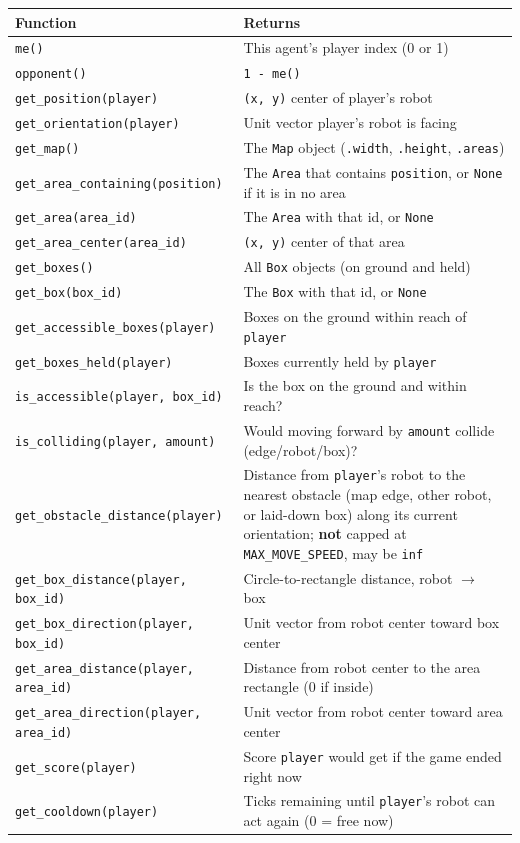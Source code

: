 \documentclass[11pt,a4paper]{article}
\newcommand{\code}[1]{\texttt{#1}}
\newcommand{\func}[1]{\texttt{#1}}
\begin{document}
\begin{longtable}{p{6.7cm}p{8.3cm}}
\toprule
\textbf{Function} & \textbf{Returns} \\
\midrule
\endhead
\func{me()} & This agent's player index (0 or 1) \\
\func{opponent()} & \code{1 - me()} \\
\func{get\_position(player)} & \code{(x, y)} center of player's robot \\
\func{get\_orientation(player)} & Unit vector player's robot is facing \\
\func{get\_map()} & The \code{Map} object (\code{.width}, \code{.height}, \code{.areas}) \\
\func{get\_area\_containing(position)} & The \code{Area} that contains \code{position}, or \code{None} if it is in no area \\
\func{get\_area(area\_id)} & The \code{Area} with that id, or \code{None} \\
\func{get\_area\_center(area\_id)} & \code{(x, y)} center of that area \\
\func{get\_boxes()} & All \code{Box} objects (on ground and held) \\
\func{get\_box(box\_id)} & The \code{Box} with that id, or \code{None} \\
\func{get\_accessible\_boxes(player)} & Boxes on the ground within reach of \code{player} \\
\func{get\_boxes\_held(player)} & Boxes currently held by \code{player} \\
\func{is\_accessible(player, box\_id)} & Is the box on the ground and within reach? \\
\func{is\_colliding(player, amount)} & Would moving forward by \code{amount} collide (edge/robot/box)? \\
\func{get\_obstacle\_distance(player)} & Distance from \code{player}'s robot to the nearest obstacle (map edge, other robot, or laid-down box) along its current orientation; \textbf{not} capped at \code{MAX\_MOVE\_SPEED}, may be \code{inf} \\
\func{get\_box\_distance(player, box\_id)} & Circle-to-rectangle distance, robot $\to$ box \\
\func{get\_box\_direction(player, box\_id)} & Unit vector from robot center toward box center \\
\func{get\_area\_distance(player, area\_id)} & Distance from robot center to the area rectangle (0 if inside) \\
\func{get\_area\_direction(player, area\_id)} & Unit vector from robot center toward area center \\
\func{get\_score(player)} & Score \code{player} would get if the game ended right now \\
\func{get\_cooldown(player)} & Ticks remaining until \code{player}'s robot can act again (0 = free now) \\
\bottomrule
\end{longtable}
\end{document}
